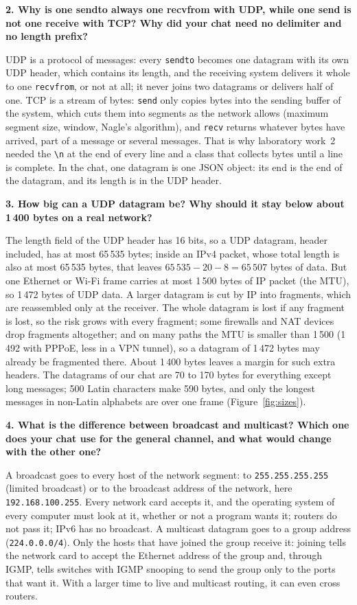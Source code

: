 \documentclass[11pt,a4paper]{article}
\newcommand{\question}[1]{\par\medskip\textbf{#1}\par}
\newcommand{\code}[1]{{\frenchspacing\texttt{#1}}}
\begin{document}
\question{2. Why is one sendto always one recvfrom with UDP, while one send is not one receive with
TCP? Why did your chat need no delimiter and no length prefix?}

UDP is a protocol of messages: every \code{sendto} becomes one datagram with its own UDP header,
which contains its length, and the receiving system delivers it whole to one \code{recvfrom}, or not
at all; it never joins two datagrams or delivers half of one. TCP is a stream of bytes: \code{send}
only copies bytes into the sending buffer of the system, which cuts them into segments as the network
allows (maximum segment size, window, Nagle's algorithm), and \code{recv} returns whatever bytes have
arrived, part of a message or several messages. That is why laboratory work~2 needed the \code{\textbackslash n}
at the end of every line and a class that collects bytes until a line is complete. In the chat, one
datagram is one JSON object: its end is the end of the datagram, and its length is in the UDP header.

\question{3. How big can a UDP datagram be? Why should it stay below about 1\,400 bytes on a real
network?}

The length field of the UDP header has 16 bits, so a UDP datagram, header included, has at most
65\,535 bytes; inside an IPv4 packet, whose total length is also at most 65\,535 bytes, that leaves
$65\,535 - 20 - 8 = 65\,507$ bytes of data. But one Ethernet or Wi-Fi frame carries at most 1\,500
bytes of IP packet (the MTU), so 1\,472 bytes of UDP data. A larger datagram is cut by IP into
fragments, which are reassembled only at the receiver. The whole datagram is lost if any fragment is
lost, so the risk grows with every fragment; some firewalls and NAT devices drop fragments
altogether; and on many paths the MTU is smaller than 1\,500 (1\,492 with PPPoE, less in a VPN
tunnel), so a datagram of 1\,472 bytes may already be fragmented there. About 1\,400 bytes leaves a
margin for such extra headers. The datagrams of our chat are 70 to 170 bytes for everything except
long messages; 500 Latin characters make 590 bytes, and only the longest messages in non-Latin
alphabets are over one frame (Figure~\ref{fig:sizes}).

\question{4. What is the difference between broadcast and multicast? Which one does your chat use
for the general channel, and what would change with the other one?}

A broadcast goes to every host of the network segment: to \code{255.255.255.255} (limited broadcast)
or to the broadcast address of the network, here \code{192.168.100.255}. Every network card accepts
it, and the operating system of every computer must look at it, whether or not a program wants it;
routers do not pass it; IPv6 has no broadcast. A multicast datagram goes to a group address
(\code{224.0.0.0/4}). Only the hosts that have joined the group receive it: joining tells the network
card to accept the Ethernet address of the group and, through IGMP, tells switches with IGMP snooping
to send the group only to the ports that want it. With a larger time to live and multicast routing,
it can even cross routers.
\end{document}
